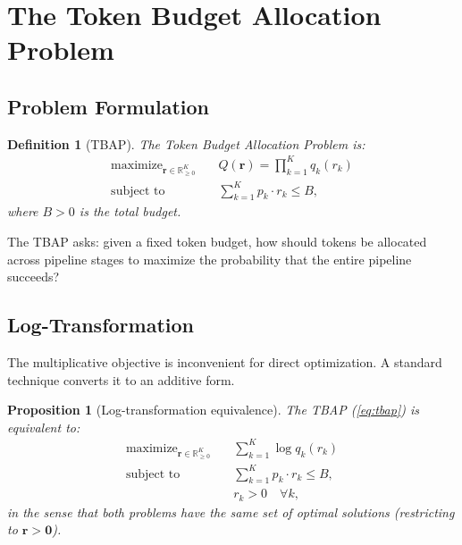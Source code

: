 \documentclass[11pt, a4paper, copyright]{googledeepmind}
\DeclareMathOperator*{\maximize}{maximize}
\newtheorem{definition}{Definition}[section]
\newtheorem{proposition}{Proposition}[section]
\begin{document}
\section{The Token Budget Allocation Problem}\label{sec:tbap}

\subsection{Problem Formulation}

\begin{definition}[TBAP]\label{def:tbap}
The \emph{Token Budget Allocation Problem} is:
\begin{equation}\label{eq:tbap}
\begin{aligned}
    \maximize_{\mathbf{r} \in \mathbb{R}_{\geq 0}^K} \quad & Q(\mathbf{r}) = \prod_{k=1}^{K} q_k(r_k) \\
    \text{subject to} \quad & \sum_{k=1}^{K} p_k \cdot r_k \leq B,
\end{aligned}
\end{equation}
where $B > 0$ is the total budget.
\end{definition}

The TBAP asks: given a fixed token budget, how should tokens be allocated across pipeline stages to maximize the probability that the entire pipeline succeeds?

\subsection{Log-Transformation}

The multiplicative objective is inconvenient for direct optimization. A standard technique converts it to an additive form.

\begin{proposition}[Log-transformation equivalence]\label{prop:log-transform}
The TBAP (\cref{eq:tbap}) is equivalent to:
\begin{equation}\label{eq:tbap-log}
\begin{aligned}
    \maximize_{\mathbf{r} \in \mathbb{R}_{\geq 0}^K} \quad & \sum_{k=1}^{K} \log q_k(r_k) \\
    \text{subject to} \quad & \sum_{k=1}^{K} p_k \cdot r_k \leq B, \\
    & r_k > 0 \quad \forall k,
\end{aligned}
\end{equation}
in the sense that both problems have the same set of optimal solutions (restricting to $\mathbf{r} > \mathbf{0}$).
\end{proposition}
\end{document}
